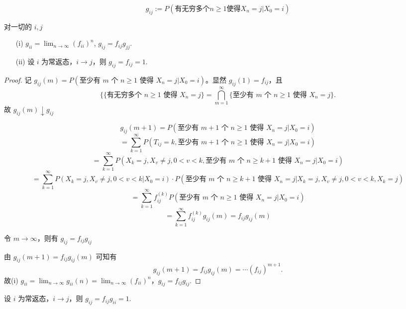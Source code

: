 \documentclass[lang=cn,10pt,thmcnt=section]{elegantbook}
\begin{document}
\[
g_{ij} := P(\text{有无穷多个} n \geq 1 \text{使得} X_n = j | X_0 = i)
\]

\begin{theorem}
	对一切的 $i, j$
\begin{enumerate}
    \item[(i)] $g_{ii} = \lim_{n \to \infty} (f_{ii})^n$, $g_{ij} = f_{ij} g_{jj}$.
    \item[(ii)] 设 $i$ 为常返态，$i \rightarrow j$，则 $g_{ij} = f_{ij} = 1$.
\end{enumerate}
\end{theorem}
\begin{proof}
	记 $g_{ij}(m) = P(\text{至少有 } m \text{ 个 } n \geq 1 \text{ 使得 } X_n = j | X_0 = i)$。显然 $g_{ij}(1) = f_{ij}$，且
\[
\{\{ \text{有无穷多个 } n \ge 1 \text{ 使得 } X_n = j \} = \bigcap_{m=1}^{\infty} {\{ \text{至少有 } m \text{ 个 } n \ge 1 \text{ 使得 } X_n = j \}}.
\]
故 $g_{ij}(m) \downarrow g_{ij}$

\[
g_{ij}(m+1) = P(\text{至少有 } m+1 \text{ 个 } n \ge 1 \text{ 使得 } X_n = j | X_0 = i)
\]
\[
= \sum_{k=1}^{\infty} P(T_{ij} = k, \text{至少有 } m+1 \text{ 个 } n \ge 1 \text{ 使得 } X_n = j | X_0 = i)
\]
\[
= \sum_{k=1}^{\infty} P(X_k = j, X_v \neq j, 0 < v < k, \text{至少有 } m \text{ 个 } n \ge k+1 \text{ 使得 } X_n = j | X_0 = i)
\]
\[
= \sum_{k=1}^{\infty} P(X_k = j, X_v \neq j, 0 < v < k | X_0 = i) \cdot P(\text{至少有 } m \text{ 个 } n \ge k+1 \text{ 使得 } X_n = j | X_k = j, X_v \neq j, 0 < v < k, X_k = j)
\]
\[
= \sum_{k=1}^{\infty} f_{ij}^{(k)} P(\text{至少有 } m \text{ 个 } n \ge 1 \text{ 使得 } X_n = j | X_0 = i)
\]
\[
= \sum_{k=1}^{\infty} f_{ij}^{(k)} g_{ij}(m) = f_{ij} g_{ij}(m)
\]

令 $m \to \infty$，则有 $g_{ij} = f_{ij} g_{ij}$

由 $g_{ij}(m+1) = f_{ij} g_{ij}(m)$ 可知有
\[
g_{ij}(m+1) = f_{ij} g_{ij}(m) = \cdots (f_{ij})^{m+1}.
\]
故(i) $g_{ii} = \lim_{n \to \infty} g_{ii}(n) = \lim_{n \to \infty} (f_{ii})^n$，$g_{ij} = f_{ij} g_{ij}$.
\end{proof}
\begin{theorem}
	设 $i$ 为常返态，$i \rightarrow j$，则 $g_{ij} = f_{ij} g_{ii} = 1$.

\end{theorem}
\end{document}
